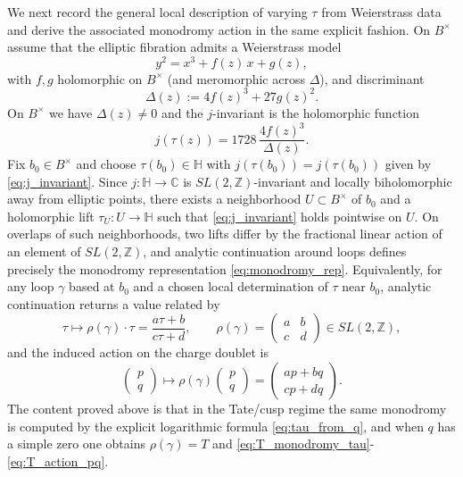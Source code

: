 \documentclass[11pt]{article}
\theoremstyle{remark}
\begin{document}
We next record the general local description of varying $\tau$ from Weierstrass data and derive the associated monodromy action in the same explicit fashion. On $B^\times$ assume that the elliptic fibration admits a Weierstrass model
\begin{equation}\label{eq:weierstrass}
y^2=x^3+f(z)\,x+g(z),
\end{equation}
with $f,g$ holomorphic on $B^\times$ (and meromorphic across $\Delta$), and discriminant
\begin{equation}\label{eq:discriminant}
\Delta(z):=4f(z)^3+27g(z)^2.
\end{equation}
On $B^\times$ we have $\Delta(z)\neq 0$ and the $j$-invariant is the holomorphic function
\begin{equation}\label{eq:j_invariant}
j(\tau(z))=1728\,\frac{4f(z)^3}{\Delta(z)}.
\end{equation}
Fix $b_0\in B^\times$ and choose $\tau(b_0)\in\mathbb{H}$ with $j(\tau(b_0))=j(\tau(b_0))$ given by \eqref{eq:j_invariant}. Since $j:\mathbb{H}\to\mathbb{C}$ is $SL(2,\mathbb{Z})$-invariant and locally biholomorphic away from elliptic points, there exists a neighborhood $U\subset B^\times$ of $b_0$ and a holomorphic lift $\tau_U:U\to\mathbb{H}$ such that \eqref{eq:j_invariant} holds pointwise on $U$. On overlaps of such neighborhoods, two lifts differ by the fractional linear action of an element of $SL(2,\mathbb{Z})$, and analytic continuation around loops defines precisely the monodromy representation \eqref{eq:monodromy_rep}. Equivalently, for any loop $\gamma$ based at $b_0$ and a chosen local determination of $\tau$ near $b_0$, analytic continuation returns a value related by
\begin{equation}\label{eq:general_monodromy_tau}
\tau\longmapsto \rho(\gamma)\cdot\tau=\frac{a\tau+b}{c\tau+d},\qquad \rho(\gamma)=\begin{pmatrix}a&b\\ c&d\end{pmatrix}\in SL(2,\mathbb{Z}),
\end{equation}
and the induced action on the charge doublet is
\begin{equation}\label{eq:general_monodromy_pq}
\begin{pmatrix}p\\ q\end{pmatrix}\longmapsto \rho(\gamma)\begin{pmatrix}p\\ q\end{pmatrix}=\begin{pmatrix}ap+bq\\ cp+dq\end{pmatrix}.
\end{equation}
The content proved above is that in the Tate/cusp regime the same monodromy is computed by the explicit logarithmic formula \eqref{eq:tau_from_q}, and when $q$ has a simple zero one obtains $\rho(\gamma)=T$ and \eqref{eq:T_monodromy_tau}-\eqref{eq:T_action_pq}.
\end{document}
